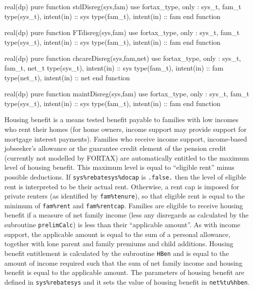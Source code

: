 \documentclass[11pt,thmsa,letter,ukenglish]{article}
\begin{document}
\begin{fortrancode}
real(dp) pure function stdDisreg(sys,fam)
    use fortax_type, only : sys_t, fam_t
    type(sys_t), intent(in) :: sys
    type(fam_t), intent(in) :: fam
end function
\end{fortrancode}

\begin{fortrancode}
real(dp) pure function FTdisreg(sys,fam)
    use fortax_type, only : sys_t, fam_t
    type(sys_t), intent(in) :: sys
    type(fam_t), intent(in) :: fam
end function
\end{fortrancode}

\begin{fortrancode}
real(dp) pure function chcareDisreg(sys,fam,net)
    use fortax_type, only : sys_t, fam_t, net_t
    type(sys_t), intent(in) :: sys
    type(fam_t), intent(in) :: fam
    type(net_t), intent(in) :: net
end function
\end{fortrancode}

\begin{fortrancode}
real(dp) pure function maintDisreg(sys,fam)
    use fortax_type, only : sys_t, fam_t
    type(sys_t), intent(in) :: sys
    type(fam_t), intent(in) :: fam
end function
\end{fortrancode}

Housing benefit is a means tested benefit payable to families with low incomes who rent their homes (for home owners, income support may provide support for mortgage interest payments).  Families who receive income support, income-based jobseeker's allowance or the guarantee credit element of the pension credit (currently not modelled by FORTAX) are automatically entitled to the maximum level of housing benefit. This maximum level is equal to ``eligible rent'' minus possible deductions.  If \texttt{sys\%rebatesys\%docap} is \texttt{.false.} then the level of eligible rent is interpreted to be their actual rent. Otherwise, a rent cap is imposed for private renters (as identified by \texttt{fam\%tenure}), so that eligible rent is equal to the minimum of \texttt{fam\%rent} and \texttt{fam\%rentcap}. Families are eligible to receive housing benefit if a measure of net family income (less any disregards as calculated by the subroutine \texttt{prelimCalc}) is less than their ``applicable amount''. As with income support, the applicable amount is equal to the sum of a personal allowance, together with lone parent and family premiums and child additions. Housing benefit entitlement is calculated by the subroutine \texttt{HBen} and is equal to the amount of income required such that the sum of net family income and housing benefit is equal to the applicable amount. The parameters of housing benefit are defined in \texttt{sys\%rebatesys} and it sets the value of housing benefit in \texttt{net\%tu\%hben}.
\end{document}
